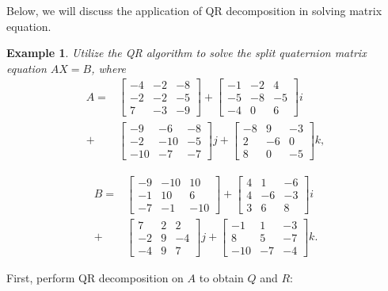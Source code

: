 \documentclass[5p]{elsarticle}
\newtheorem{example}[theorem]{Example}
\numberwithin{equation}{section}
\begin{document}
Below, we will discuss the application of QR decomposition in solving matrix equation.
\begin{example}
Utilize the QR algorithm to solve the split quaternion matrix equation $AX = B$, where
\begin{align*}
A =
& \begin{bmatrix}
-4 & -2 & -8 \\
-2 & -2 & -5 \\
7 & -3 & -9
\end{bmatrix} +
\begin{bmatrix}
-1 & -2 & 4 \\
-5 & -8 & -5 \\
-4 & 0 & 6
\end{bmatrix} i \\
+ 
& \begin{bmatrix}
-9 & -6 & -8 \\
-2 & -10 & -5 \\
-10 & -7 & -7
\end{bmatrix} j +
\begin{bmatrix}
-8 & 9 & -3 \\
2 & -6 & 0 \\
8 & 0 & -5
\end{bmatrix} k,
\end{align*}

\begin{align*}
B =
& \begin{bmatrix}
-9 & -10 & 10 \\
-1 & 10 & 6 \\
-7 & -1 & -10
\end{bmatrix} +
\begin{bmatrix}
4 & 1 & -6 \\
4 & -6 & -3 \\
3 & 6 & 8
\end{bmatrix} i \\
+
& \begin{bmatrix}
7 & 2 & 2 \\
-2 & 9 & -4 \\
-4 & 9 & 7
\end{bmatrix} j +
\begin{bmatrix}
-1 & 1 & -3 \\
8 & 5 & -7 \\
-10 & -7 & -4
\end{bmatrix} k.
\end{align*}
\end{example}  
First, perform QR decomposition on $A$ to obtain $Q$ and $R:$
\setlength{\jot}{5pt}
\end{document}
